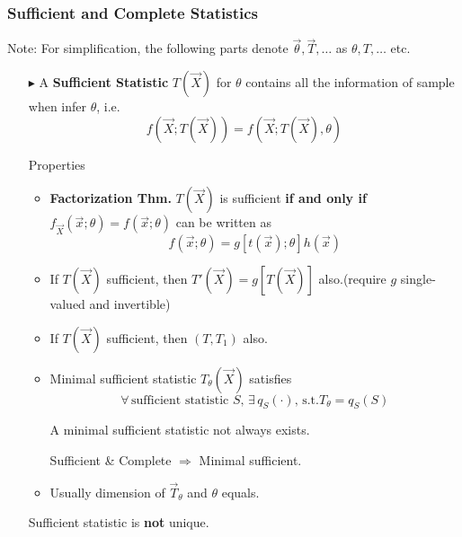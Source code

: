 \subsubsection{Sufficient and Complete Statistics}\label{SubSectionSufficient_CompleteStatistics}
    Note: For simplification, the following parts denote $\vec{\theta},\vec{T},\ldots$  as $\theta,T,\ldots$ etc.
    \begin{itemize}
        \item[$\blacktriangleright$] A \textbf{Sufficient Statistic} $T(\vec{X})$ for $\theta$ contains all the information of sample when infer $\theta$, i.e.
        \begin{equation}
            f(\vec{X};T(\vec{X}))=f(\vec{X};T(\vec{X}),\theta)
        \end{equation}

        Properties
        \begin{itemize}
            \item \textbf{Factorization Thm.} $T(\vec{X})$ is sufficient \textbf{if and only if} $f_{\vec{X}}(\vec{x};\theta)=f(\vec{x};\theta)$ can be written as 
            \begin{equation}
                f(\vec{x};\theta)=g[t(\vec{x});\theta]h(\vec{x})
            \end{equation}            
            \item If $T(\vec{X})$ sufficient, then $T'(\vec{X})=g[T(\vec{X})]$ also.(require $g$ single-valued and invertible)
            \item If $T(\vec{X})$ sufficient, then $(T,T_1)$ also.
            \item Minimal sufficient statistic $T_\theta(\vec{X})$ satisfies 
            \begin{equation}
                \forall\,\text{sufficient statistic }S,\,\exists\, q_S(\cdot),\, \text{s.t.} T_\theta=q_S(S)
            \end{equation}

            A minimal sufficient statistic not always exists.

            Sufficient \& Complete $\Rightarrow $ Minimal sufficient.
            \item Usually dimension of $\vec{T}_\theta$ and $\theta$ equals.
        \end{itemize}
        
        Sufficient statistic is \textbf{not} unique.




\end{itemize}
